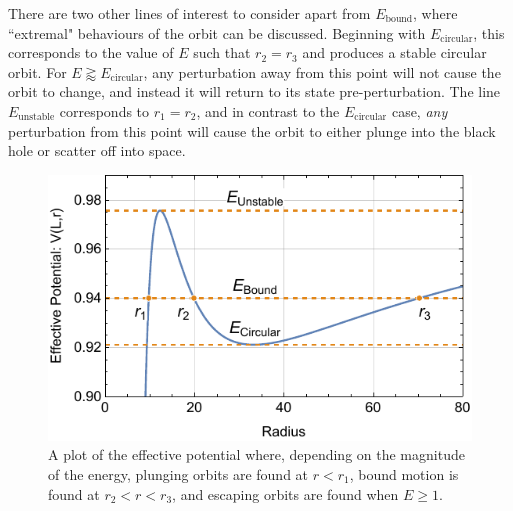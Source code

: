 There are two other lines of interest to consider apart from $E_\text{bound}$, where ``extremal" behaviours of the orbit can be discussed.
Beginning with $E_\text{circular}$, this corresponds to the value of $E$ such that $r_2=r_3$ and produces a stable circular orbit.
For $E\gtrapprox E_\text{circular}$, any perturbation away from this point will not cause the orbit to change, and instead it will return to its state pre-perturbation.
The line $E_\text{unstable}$ corresponds to $r_1=r_2$, and in contrast to the $E_\text{circular}$ case, \textit{any} perturbation from this point will cause the orbit to either plunge into the black hole or scatter off into space.

\begin{figure}[!ht]
    \centering
    \includegraphics{images/RadialPotentialPE.pdf}
    \caption[Plot of the effective potential in the Schwarzschild metric]{A plot of the effective potential where, depending on the magnitude of the energy, plunging orbits are found at $r<r_1$, bound motion is found at $r_2<r<r_3$, and escaping orbits are found when $E\geq 1$.}
    \label{fig:radEffPot}
\end{figure}


